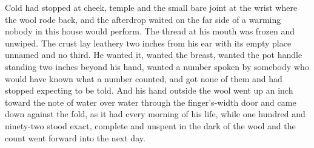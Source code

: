 Cold had stopped at cheek, temple and the small bare joint at the wrist where the wool rode back, and the afterdrop waited on the far side of a warming nobody in this house would perform. The thread at his mouth was frozen and unwiped. The crust lay leathery two inches from his ear with its empty place unnamed and no third. He wanted it, wanted the breast, wanted the pot handle standing two inches beyond his hand, wanted a number spoken by somebody who would have known what a number counted, and got none of them and had stopped expecting to be told. And his hand outside the wool went up an inch toward the note of water over water through the finger's-width door and came down against the fold, as it had every morning of his life, while one hundred and ninety-two stood exact, complete and unspent in the dark of the wool and the count went forward into the next day.
